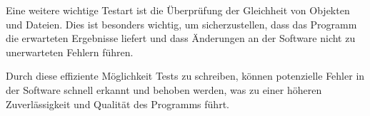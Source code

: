 Eine weitere wichtige Testart ist die Überprüfung der Gleichheit von Objekten und Dateien. Dies ist besonders 
wichtig, um sicherzustellen, dass das Programm die erwarteten Ergebnisse liefert und dass Änderungen an der 
Software nicht zu unerwarteten Fehlern führen.

Durch diese effiziente Möglichkeit Tests zu schreiben, können potenzielle Fehler in der Software schnell erkannt 
und behoben werden, was zu einer höheren Zuverlässigkeit und Qualität des Programms führt.